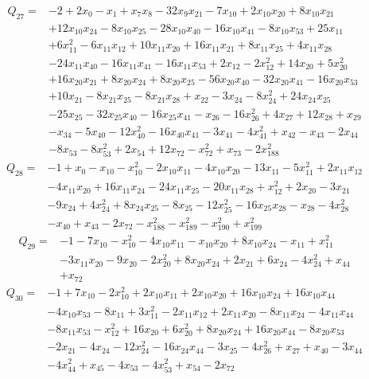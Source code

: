 \begin{equation*}\begin{aligned}
Q_{27}={}& -2+2x_{0}-x_{1}+x_{7}x_{8}-32x_{9}x_{21}-7x_{10}+2x_{10}x_{20}+8x_{10}x_{21}\\
& +12x_{10}x_{24}-8x_{10}x_{25}-28x_{10}x_{40}-16x_{10}x_{41}-8x_{10}x_{53}+25x_{11}\\
& +6x_{11}^{2}-6x_{11}x_{12}+10x_{11}x_{20}+16x_{11}x_{21}+8x_{11}x_{25}+4x_{11}x_{28}\\
& -24x_{11}x_{40}-16x_{11}x_{41}-16x_{11}x_{53}+2x_{12}-2x_{12}^{2}+14x_{20}+5x_{20}^{2}\\
& +16x_{20}x_{21}+8x_{20}x_{24}+8x_{20}x_{25}-56x_{20}x_{40}-32x_{20}x_{41}-16x_{20}x_{53}\\
& +10x_{21}-8x_{21}x_{25}-8x_{21}x_{28}+x_{22}-3x_{24}-8x_{24}^{2}+24x_{24}x_{25}\\
& -25x_{25}-32x_{25}x_{40}-16x_{25}x_{41}-x_{26}-16x_{26}^{2}+4x_{27}+12x_{28}+x_{29}\\
& -x_{34}-5x_{40}-12x_{40}^{2}-16x_{40}x_{41}-3x_{41}-4x_{41}^{2}+x_{42}-x_{43}-2x_{44}\\
& -8x_{53}-8x_{53}^{2}+2x_{54}+12x_{72}-x_{72}^{2}+x_{73}-2x_{188}^{2}
\end{aligned}\end{equation*}
\begin{equation*}\begin{aligned}
Q_{28}={}& -1+x_{0}-x_{10}-x_{10}^{2}-2x_{10}x_{11}-4x_{10}x_{20}-13x_{11}-5x_{11}^{2}+2x_{11}x_{12}\\
& -4x_{11}x_{20}+16x_{11}x_{24}-24x_{11}x_{25}-20x_{11}x_{28}+x_{12}^{2}+2x_{20}-3x_{21}\\
& -9x_{24}+4x_{24}^{2}+8x_{24}x_{25}-8x_{25}-12x_{25}^{2}-16x_{25}x_{28}-x_{28}-4x_{28}^{2}\\
& -x_{40}+x_{43}-2x_{72}-x_{188}^{2}-x_{189}^{2}-x_{190}^{2}+x_{199}^{2}
\end{aligned}\end{equation*}
\begin{equation*}\begin{aligned}
Q_{29}={}& -1-7x_{10}-x_{10}^{2}-4x_{10}x_{11}-x_{10}x_{20}+8x_{10}x_{24}-x_{11}+x_{11}^{2}\\
& -3x_{11}x_{20}-9x_{20}-2x_{20}^{2}+8x_{20}x_{24}+2x_{21}+6x_{24}-4x_{24}^{2}+x_{44}\\
& +x_{72}
\end{aligned}\end{equation*}
\begin{equation*}\begin{aligned}
Q_{30}={}& -1+7x_{10}-2x_{10}^{2}+2x_{10}x_{11}+2x_{10}x_{20}+16x_{10}x_{24}+16x_{10}x_{44}\\
& -4x_{10}x_{53}-8x_{11}+3x_{11}^{2}-2x_{11}x_{12}+2x_{11}x_{20}-8x_{11}x_{24}-4x_{11}x_{44}\\
& -8x_{11}x_{53}-x_{12}^{2}+16x_{20}+6x_{20}^{2}+8x_{20}x_{24}+16x_{20}x_{44}-8x_{20}x_{53}\\
& -2x_{21}-4x_{24}-12x_{24}^{2}-16x_{24}x_{44}-3x_{25}-4x_{26}^{2}+x_{27}+x_{40}-3x_{44}\\
& -4x_{44}^{2}+x_{45}-4x_{53}-4x_{53}^{2}+x_{54}-2x_{72}
\end{aligned}\end{equation*}
